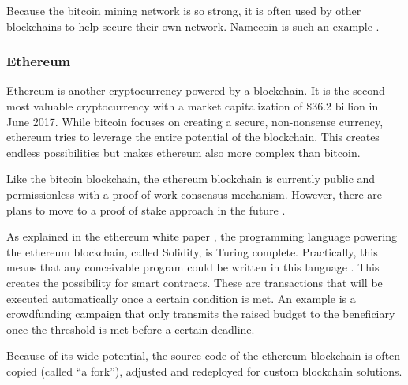 Because the bitcoin mining network is so strong, it is often used by other blockchains to help secure their own network. Namecoin is such an example \cite{namecoin-whitepaper}.

\subsubsection{Ethereum}

Ethereum is another cryptocurrency powered by a blockchain. It is the second most valuable cryptocurrency with a market capitalization of \$36.2 billion in June 2017. While bitcoin focuses on creating a secure, non-nonsense currency, ethereum tries to leverage the entire potential of the blockchain. This creates endless possibilities but makes ethereum also more complex than bitcoin.

Like the bitcoin blockchain, the ethereum blockchain is currently public and permissionless with a proof of work consensus mechanism. However, there are plans to move to a proof of stake approach in the future \cite{ethereum-pos-faq}. 

As explained in the ethereum white paper \cite{ethereum-whitepaper}, the programming language powering the ethereum blockchain, called Solidity, is Turing complete. Practically, this means that any conceivable program could be written in this language \cite{definition-turing-completeness}. This creates the possibility for smart contracts. These are transactions that will be executed automatically once a certain condition is met. An example is a crowdfunding campaign that only transmits the raised budget to the beneficiary once the threshold is met before a certain deadline.

Because of its wide potential, the source code of the ethereum blockchain is often copied (called ``a fork''), adjusted and redeployed for custom blockchain solutions. 

